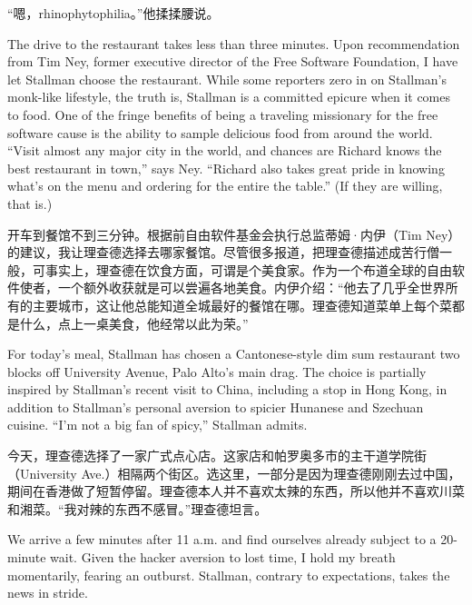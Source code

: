 \ifdefined\chs
“嗯，rhinophytophilia。”他揉揉腰说。
\fi

\ifdefined\eng
The drive to the restaurant takes less than three minutes. Upon recommendation from Tim Ney, former executive director of the Free Software Foundation, I have let Stallman choose the restaurant. While some reporters zero in on Stallman's monk-like lifestyle, the truth is, Stallman is a committed epicure when it comes to food. One of the fringe benefits of being a traveling missionary for the free software cause is the ability to sample delicious food from around the world. ``Visit almost any major city in the world, and chances are Richard knows the best restaurant in town,'' says Ney. ``Richard also takes great pride in knowing what's on the menu and ordering for the entire the table.''  (If they are willing, that is.)
\fi

\ifdefined\chs
开车到餐馆不到三分钟。根据前自由软件基金会执行总监蒂姆·内伊（Tim Ney）的建议，我让理查德选择去哪家餐馆。尽管很多报道，把理查德描述成苦行僧一般，可事实上，理查德在饮食方面，可谓是个美食家。作为一个布道全球的自由软件使者，一个额外收获就是可以尝遍各地美食。内伊介绍：“他去了几乎全世界所有的主要城市，这让他总能知道全城最好的餐馆在哪。理查德知道菜单上每个菜都是什么，点上一桌美食，他经常以此为荣。”
\fi

\ifdefined\eng
For today's meal, Stallman has chosen a Cantonese-style dim sum restaurant two blocks off University Avenue, Palo Alto's main drag. The choice is partially inspired by Stallman's recent visit to China, including a stop in Hong Kong, in addition to Stallman's personal aversion to spicier Hunanese and Szechuan cuisine. ``I'm not a big fan of spicy,'' Stallman admits.
\fi

\ifdefined\chs
今天，理查德选择了一家广式点心店。这家店和帕罗奥多市的主干道学院街（University Ave.）相隔两个街区。选这里，一部分是因为理查德刚刚去过中国，期间在香港做了短暂停留。理查德本人并不喜欢太辣的东西，所以他并不喜欢川菜和湘菜。“我对辣的东西不感冒。”理查德坦言。
\fi

\ifdefined\eng
We arrive a few minutes after 11 a.m. and find ourselves already subject to a 20-minute wait. Given the hacker aversion to lost time, I hold my breath momentarily, fearing an outburst. Stallman, contrary to expectations, takes the news in stride.
\fi


